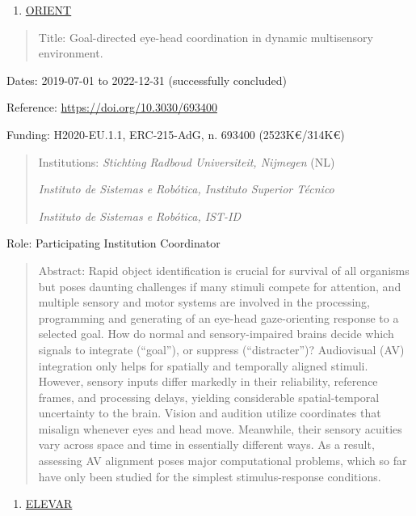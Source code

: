 \documentclass[
]{article}
\begin{document}
\begin{enumerate}
\def\labelenumi{\arabic{enumi}.}
\item
  \ul{ORIENT}
\end{enumerate}

\begin{quote}
Title: Goal-directed eye-head coordination in dynamic multisensory
environment.
\end{quote}

Dates: 2019-07-01 to 2022-12-31 (successfully concluded)

Reference: \url{https://doi.org/10.3030/693400}

Funding: H2020-EU.1.1, ERC-215-AdG, n. 693400 (2523K€/314K€)

\begin{quote}
Institutions: \emph{Stichting Radboud Universiteit, Nijmegen} (NL)

\emph{Instituto de Sistemas e Robótica, Instituto Superior Técnico}

\emph{Instituto de Sistemas e Robótica, IST-ID}
\end{quote}

Role: Participating Institution Coordinator

\begin{quote}
Abstract: Rapid object identification is crucial for survival of all
organisms but poses daunting challenges if many stimuli compete for
attention, and multiple sensory and motor systems are involved in the
processing, programming and generating of an eye-head gaze-orienting
response to a selected goal. How do normal and sensory-impaired brains
decide which signals to integrate (``goal''), or suppress
(``distracter'')? Audiovisual (AV) integration only helps for spatially
and temporally aligned stimuli. However, sensory inputs differ markedly
in their reliability, reference frames, and processing delays, yielding
considerable spatial-temporal uncertainty to the brain. Vision and
audition utilize coordinates that misalign whenever eyes and head move.
Meanwhile, their sensory acuities vary across space and time in
essentially different ways. As a result, assessing AV alignment poses
major computational problems, which so far have only been studied for
the simplest stimulus-response conditions.
\end{quote}

\begin{enumerate}
\def\labelenumi{\arabic{enumi}.}
\setcounter{enumi}{1}
\item
  \ul{ELEVAR}
\end{enumerate}
\end{document}

